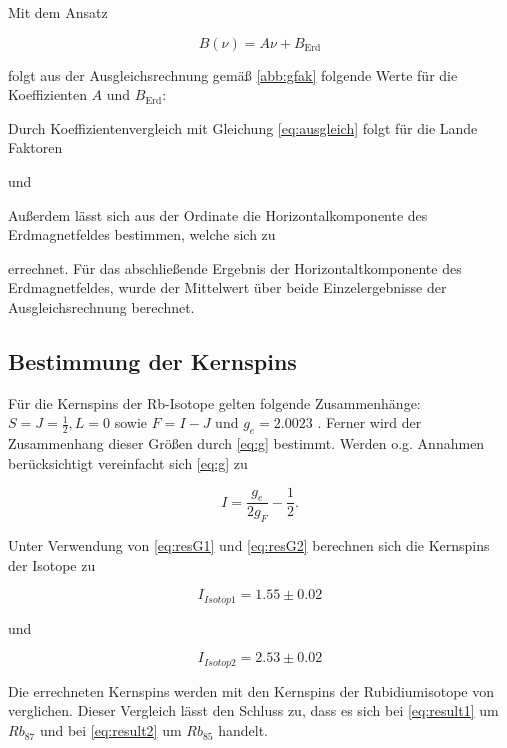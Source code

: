 Mit dem Ansatz

\begin{equation}
B(\nu) = A\nu + B_\text{Erd}
\end{equation}

folgt aus der Ausgleichsrechnung gemäß \autoref{abb:gfak} folgende Werte für die Koeffizienten $A$ und $B_\text{Erd}$:



Durch Koeffizientenvergleich mit Gleichung \ref{eq:ausgleich} folgt für die Lande Faktoren



und



Außerdem lässt sich aus der Ordinate die Horizontalkomponente des Erdmagnetfeldes bestimmen,
welche sich zu



errechnet. Für das abschließende Ergebnis der Horizontaltkomponente des Erdmagnetfeldes, wurde der Mittelwert über beide Einzelergebnisse der Ausgleichsrechnung berechnet.

\subsection{Bestimmung der Kernspins}
Für die Kernspins der Rb-Isotope gelten folgende Zusammenhänge: $S = J = \frac{1}{2} , L = 0$ sowie $F = I - J$ und $g_e = 2.0023$ \cite{landeE-}. Ferner wird
der Zusammenhang dieser Größen durch \ref{eq:g} bestimmt. Werden o.g. Annahmen berücksichtigt vereinfacht sich \ref{eq:g} zu

\begin{equation}
I = \frac{g_e}{2g_F} - \frac{1}{2}.
\end{equation}

Unter Verwendung von \ref{eq:resG1} und \ref{eq:resG2} berechnen sich die Kernspins der Isotope zu

\begin{equation}
I_{Isotop1} = 1.55 \pm 0.02 
\label{eq:result1}
\end{equation}

und

\begin{equation}
I_{Isotop2} = 2.53 \pm 0.02
\label{eq:result2}
\end{equation}

Die errechneten Kernspins werden mit den Kernspins der Rubidiumisotope von \cite{coreSpin} verglichen. Dieser Vergleich lässt den Schluss zu,
dass es sich bei \ref{eq:result1} um $Rb_{87}$ und bei \ref{eq:result2} um $Rb_{85}$ handelt.

